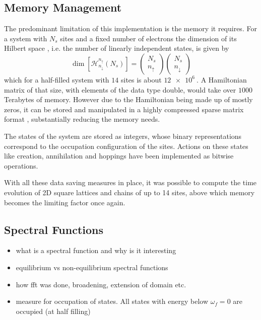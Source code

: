 \subsection{Memory Management}
The predominant limitation of this implementation is the memory it requires. For a system with $N_s$ sites and a fixed number of electrons the dimension of its Hilbert space , i.e. the number of linearly independent states, is given by 
\begin{equation}
    \dim \left[\mathcal{H}^{n_\uparrow}_{n_\downarrow} (N_s)\right] = \begin{pmatrix}N_s \\ n_\uparrow\end{pmatrix} \begin{pmatrix}N_s \\ n_\downarrow\end{pmatrix}
\end{equation}
which for a half-filled system with $14$ sites is about $\SI{12e6}{}$. A Hamiltonian matrix of that size, with elements of the data type double, would take over $1000$ Terabytes of memory. However due to the Hamiltonian being made up of mostly zeros, it can be stored and manipulated in a highly compressed sparse matrix format \cite{innerberger}, substantially reducing the memory needs.
\medskip

The states of the system are stored as integers, whose binary representations correspond to the occupation configuration of the sites. Actions on these states like creation, annihilation and hoppings have been implemented as bitwise operations.
\medskip
 
With all these data saving measures in place, it was possible to compute the time evolution of 2D square lattices and chains of up to 14 sites, above which memory becomes the limiting factor once again.


\subsection{Spectral Functions}\label{sec:spectral_functions}
\begin{itemize}
    \item what is a spectral function and why is it interesting
    \item equilibrium vs non-equilibrium spectral functions
    \item how fft was done, broadening, extension of domain etc.
    \item measure for occupation of states. All states with energy below $\omega_f = 0$ are occupied (at half filling)
\end{itemize}

